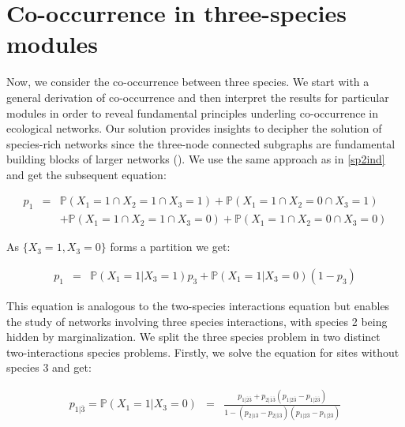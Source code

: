   \section*{Co-occurrence in three-species modules}
  \label{3spcooc}

Now, we consider the co-occurrence between three species. We start with a
general derivation of co-occurrence and then interpret the results for
particular modules in order to reveal fundamental principles underling co-occurrence in
ecological networks. Our solution provides insights to decipher the solution
of species-rich networks since the three-node connected subgraphs are
fundamental building blocks of larger networks (\citealt{Milo2002Network,
Stouffer2007Evidence, Stouffer2010Understanding}). We use the same approach as in \eqref{sp2ind} and get the subsequent equation:

  \begin{eqnarray} \label{sp3p1}
    \nonumber p_1&=& \mathbb{P}(X_{1}=1\cap X_{2}=1\cap X_{3}=1) +  \mathbb{P}(X_{1}=1\cap X_{2}=0\cap X_{3}=1) \\
      &&+ \mathbb{P}(X_{1}=1 \cap X_{2}=1 \cap X_{3}=0)+ \mathbb{P}(X_{1}=1 \cap X_{2}=0 \cap X_{3}=0)
  \end{eqnarray}


As $\{X_{3}=1,X_{3}=0\}$ forms a partition we get:

  \begin{eqnarray} \label{sp3p1b}
    p_1&=& \mathbb{P}(X_{1}=1| X_{3}=1)p_3 + \mathbb{P}(X_{1}=1| X_{3}=0)(1-p_3)
  \end{eqnarray}

This equation is analogous to the two-species interactions equation but enables the study of networks involving three species interactions, with species 2 being hidden by marginalization. We split the three species problem in two distinct two-interactions species problems. Firstly, we solve the equation for sites without species 3 and get:

  \begin{eqnarray}
    \label{sols2}
     p_{1|\overline{3}}=\mathbb{P}(X_{1}=1| X_{3}=0)&=& \frac{p_{1|\overline{2}\overline{3}}+ p_{2|\overline{1}\overline{3}} (p_{1|2\overline{3}}- p_{1|\overline{2}\overline{3}})}{1- (p_{2|1\overline{3}}-p_{2|\overline{1}\overline{3}})( p_{1|2\overline{3}} - p_{1|\overline{2}\overline{3}})}
 \end{eqnarray}

